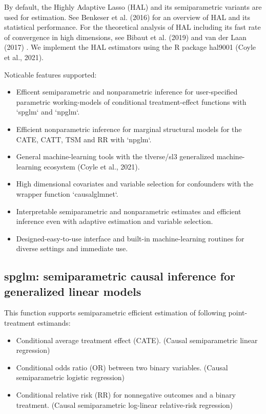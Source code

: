 \documentclass{article}
\begin{document}
By default, the Highly Adaptive Lasso (HAL) and its semiparametric variants are used for estimation. See Benkeser et al. (2016) for an overview of HAL and its statistical performance. For the theoretical analysis of HAL including its fast rate of convergence in high dimensions, see Bibaut et al. (2019) and van der Laan (2017) \nocite{bibaut2019fast}\nocite{HAL2016}\nocite{vanderlaanGenerlaTMLE}. We implement the HAL estimators using the R package hal9001 (Coyle et al., 2021).\nocite{hal1}\nocite{hal2} 
\nocite{vanderlaanGenerlaTMLE} 

Noticable features supported:
\begin{itemize}
\item Efficent semiparametric and nonparametric inference for user-specified parametric working-models of conditional treatment-effect functions with `spglm` and `npglm`.
\item  Efficient nonparametric inference for marginal structural models for the CATE, CATT, TSM and RR with `npglm`.
\item  General machine-learning tools with the tlverse/sl3 generalized machine-learning ecosystem (Coyle et al., 2021).\nocite{coyle2021sl3}
\item  High dimensional covariates and variable selection for confounders with the wrapper function `causalglmnet`.
\item  Interpretable semiparametric and nonparametric estimates and efficient inference even with adaptive estimation and variable selection.
\item  Designed-easy-to-use interface and built-in machine-learning routines for diverse settings and immediate use.
\end{itemize}

\subsection{spglm: semiparametric causal inference for generalized linear models}

This function supports semiparametric efficient estimation of following point-treatment estimands:

\begin{itemize}
\item Conditional average treatment effect (CATE). (Causal semiparametric linear regression)
\item Conditional odds ratio (OR) between two binary variables. (Causal semiparametric logistic regression)
\item Conditional relative risk (RR) for nonnegative outcomes and a binary treatment. (Causal semiparametric log-linear relative-risk regression)

\end{itemize}
\end{document}
